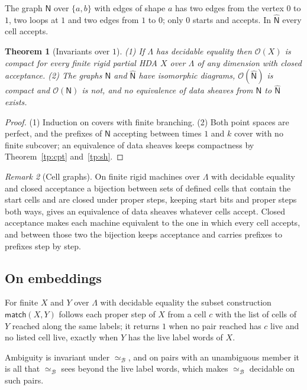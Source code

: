 \documentclass{lmcs}
\newtheorem{theorem}{Theorem}[section]
\theoremstyle{definition}
\theoremstyle{remark}
\newtheorem{remark}[theorem]{Remark}
\newcommand{\Op}{\mathcal{O}}
\newcommand{\ab}{\{a,b\}}
\providecommand{\matchB}{\mathsf{match}}
\providecommand{\eqB}{\simeq_{\mathcal{B}}}
\providecommand{\wB}{\mathsf{N}}
\providecommand{\wBh}{\hat{\mathsf{N}}}
\begin{document}
The graph $\wB$ over $\ab$ with edges of shape $a$ has two edges from the vertex $0$ to $1$, two loops at $1$ and two
edges from $1$ to $0$; only $0$ starts and accepts. In $\wBh$ every cell accepts.

\begin{theorem}[Invariants over $1$]\label{thm:dec-cb}\label{prop:dec-compact}
(1) If $\Lambda$ has decidable equality then $\Op(X)$ is compact for every finite rigid partial HDA $X$ over $\Lambda$
of any dimension with closed acceptance.
(2) The graphs $\wB$ and $\wBh$ have isomorphic diagrams, $\Op(\wBh)$ is compact and $\Op(\wB)$ is not, and no
equivalence of data sheaves from $\wB$ to $\wBh$ exists.
\end{theorem}

\begin{proof}
(1) Induction on covers with finite branching. (2) Both point spaces are
perfect, and the prefixes of $\wB$ accepting between times $1$ and $k$ cover with
no finite subcover; an equivalence of data sheaves keeps compactness by
Theorem~\ref{tp:cpt} and~\ref{tp:sh}.
\end{proof}

\begin{remark}[Cell graphs]\label{prop:dec-maps}\label{def:dec-celliso}\label{def:dec-maps}
On finite rigid machines over $\Lambda$ with decidable equality and closed acceptance a bijection between sets of
defined cells that contain the start cells and are closed under proper steps, keeping start bits and proper steps both
ways, gives an equivalence of data sheaves whatever cells accept.
Closed acceptance makes each machine equivalent to the one in which every cell accepts, and
between those two the bijection keeps acceptance and carries prefixes to prefixes step by
step.
\end{remark}

\subsection{On embeddings}\label{ssec:decide-inj}

For finite $X$ and $Y$ over $\Lambda$ with decidable equality the subset construction $\matchB(X,Y)$ follows each proper
step of $X$ from a cell $c$ with the list of cells of $Y$ reached along the same labels; it returns $1$ when no pair
reached has $c$ live and no listed cell live, exactly when $Y$ has the live label words of
$X$.

Ambiguity is invariant under $\eqB$, and on pairs with an unambiguous member it is all that $\eqB$ sees beyond the
live label words, which makes $\eqB$ decidable on such pairs.
\end{document}
